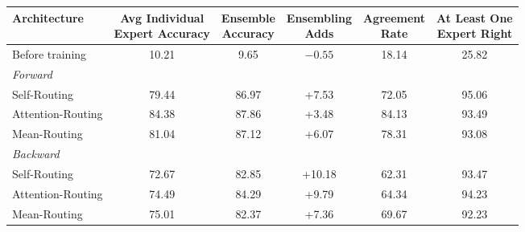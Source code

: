 \documentclass[11pt,a4paper]{article}
\newcommand{\tnote}[1]{\par\vspace{0.6ex}{\footnotesize #1}\par}
\newcommand{\panel}[1]{\multicolumn{1}{l}{\textit{#1}}}
\begin{document}
\begin{center}
\small
\begin{tabular}{@{}lccccc@{}}
\toprule
Architecture
& \shortstack{Avg Individual\\Expert Accuracy}
& \shortstack{Ensemble\\Accuracy}
& \shortstack{Ensembling\\Adds}
& \shortstack{Agreement\\Rate}
& \shortstack{At Least One\\Expert Right} \\
\midrule
Before training & 10.21 & \phantom{0}9.65 & $-0.55$ & 18.14 & 25.82 \\
\midrule
\panel{Forward} \\
\quad Self-Routing      & 79.44 & 86.97 & \phantom{0}+7.53 & 72.05 & 95.06 \\
\quad Attention-Routing & 84.38 & 87.86 & \phantom{0}+3.48 & 84.13 & 93.49 \\
\quad Mean-Routing      & 81.04 & 87.12 & \phantom{0}+6.07 & 78.31 & 93.08 \\
\midrule
\panel{Backward} \\
\quad Self-Routing      & 72.67 & 82.85 & +10.18 & 62.31 & 93.47 \\
\quad Attention-Routing & 74.49 & 84.29 & \phantom{0}+9.79 & 64.34 & 94.23 \\
\quad Mean-Routing      & 75.01 & 82.37 & \phantom{0}+7.36 & 69.67 & 92.23 \\
\bottomrule
\end{tabular}
\tnote{150 epochs, all values in \%. Differences above are $\pm$ twice the standard error (number of
trials ahead / 15).}
\end{center}
\end{document}
